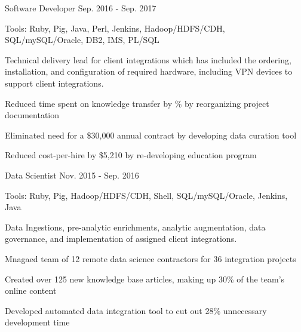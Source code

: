 \begin{cventries}
  \cvexpsubposition
    {Software Developer} %
    {Sep. 2016 - Sep. 2017} %
    {}
    {
      \begin{cvheavyparagraph}
        Tools: Ruby, Pig, Java, Perl, Jenkins, Hadoop/HDFS/CDH, SQL/mySQL/Oracle, DB2, IMS, PL/SQL
      \end{cvheavyparagraph}
    }
    {
      \begin{cvparagraph}
        Technical delivery lead for client integrations which has included the ordering, installation, and configuration of required hardware, including VPN devices to support client integrations.
      \end{cvparagraph}
      \begin{cvitems} %
        \item {Reduced time spent on knowledge transfer by \% by reorganizing project documentation}
        \item {Eliminated need for a \$30,000 annual contract by developing data curation tool}
        \item {Reduced cost-per-hire by \$5,210 by re-developing education program}
      \end{cvitems}
    }

  \cvexpsubposition
    {Data Scientist} %
    {Nov. 2015 - Sep. 2016} %
    {}
    {
      \begin{cvheavyparagraph}
        Tools: Ruby, Pig, Hadoop/HDFS/CDH, Shell, SQL/mySQL/Oracle, Jenkins, Java
      \end{cvheavyparagraph}
    }
    {
      \begin{cvparagraph}
        Data Ingestions, pre-analytic enrichments, analytic augmentation, data governance, and implementation of assigned client integrations.
      \end{cvparagraph}
      \begin{cvitems} %
        \item {Mnagaed team of 12 remote data science contractors for 36 integration projects}
        \item {Created over 125 new knowledge base articles, making up 30\% of the team's online content}
        \item {Developed automated data integration tool to cut out 28\% unnecessary development time}
      \end{cvitems}
    }


\end{cventries}
